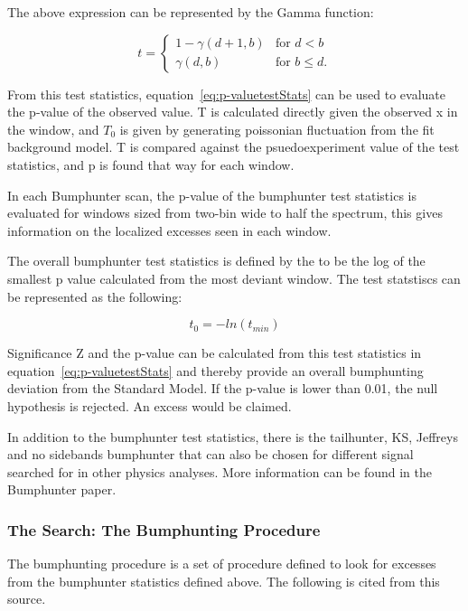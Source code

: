     The above expression can be represented by the Gamma function: 

	\begin{equation}
    t=
    \begin{cases} 1-\gamma(d+1, b) &  \textrm{for $d < b$}
    \\
    \gamma(d,b) &  \textrm{for $b \leq d$}.
    \end{cases}
    \end{equation}
    


    From this test statistics, equation~\ref{eq:p-valuetestStats} can be used to evaluate the p-value of the observed value. T is calculated directly given the observed x in the window, and $T_{0}$ is given by generating poissonian fluctuation from the fit background model. T is compared against the psuedoexperiment value of the test statistics, and p is found that way for each window. 

    In each Bumphunter scan, the p-value of the bumphunter test statistics is evaluated for windows sized from two-bin wide to half the spectrum, this gives information on the localized excesses seen in each window.

    The overall bumphunter test statistics is defined by the to be the log of the smallest p value calculated from the most deviant window. The test statstiscs can be represented as the following:

    \begin{equation}
        t_{0} = - ln (t_{min}) 
    \end{equation}

    Significance Z and the p-value can be calculated from this test statistics in equation~\ref{eq:p-valuetestStats} and thereby provide an overall bumphunting deviation from the Standard Model. If the p-value is lower than 0.01, the null hypothesis is rejected. An excess would be claimed. 

    In addition to the bumphunter test statistics, there is the tailhunter, KS, Jeffreys and no sidebands bumphunter that can also be chosen for different signal searched for in other physics analyses. More information can be found in the Bumphunter paper\cite{choudalakis2011hypothesis}.

    \subsubsection{The Search: The Bumphunting Procedure}
    The bumphunting procedure is a set of procedure defined to look for excesses from the bumphunter statistics defined above. The following is cited from this source\cite{Pachal:206032}.

